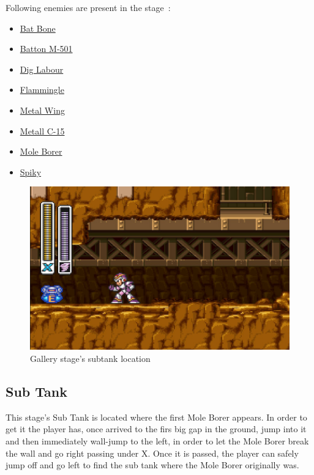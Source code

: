 Following enemies are present in the stage~\cite{wiki:Gallery}:
\begin{itemize}
	\item \hyperlink{enem:Batton_Bone}{Bat Bone} 
	\item \hyperlink{enem:Batton_M-501}{Batton M-501} 
	\item \hyperlink{enem:Dig_Labour}{Dig Labour} 
	\item \hyperlink{enem:Flammingle}{Flammingle} 
	\item \hyperlink{enem:Metal_Wing}{Metal Wing} 
	\item \hyperlink{enem:Metall_C-15}{Metall C-15} 
	\item \hyperlink{miniboss:Mole_Borer}{Mole Borer}
	\item \hyperlink{enem:Spiky}{Spiky}
\end{itemize}
\begin{figure}[htp]
	\centering
	\includegraphics[width=0.5\linewidth]{figures/X1/Armored_armadillo/Armadillo_tank.jpg}
	\caption{Gallery stage's subtank location}
\end{figure}
\subsection{Sub Tank}
This stage's Sub Tank is located where the first Mole Borer appears. In order to get it the player has, once arrived to the firs big gap in the ground, jump into it and then immediately wall-jump to the left, in order to let the Mole Borer break the wall and go right passing under X. Once it is passed, the player can safely jump off and go left to find the sub tank where the Mole Borer originally was. 


